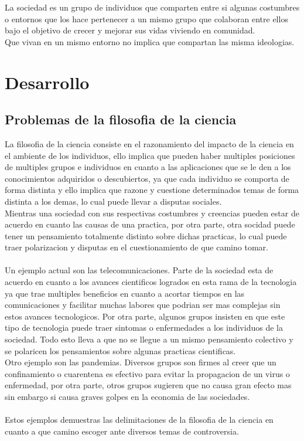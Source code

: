 La sociedad es un grupo de individuos que comparten entre si algunas costumbres o entornos que los hace pertenecer a un mismo grupo que colaboran entre ellos bajo el objetivo de crecer y mejorar sus vidas viviendo en comunidad.\\
Que vivan en un mismo entorno no implica que compartan las misma ideologias.

\section{Desarrollo}

\subsection{Problemas de la filosofia de la ciencia}

La filosofia de la ciencia consiste en el razonamiento del impacto de la ciencia en el ambiente de los individuos, ello implica que pueden haber multiples posiciones de multiples grupos e individuos en cuanto a las aplicaciones que se le den a los conocimientos adquiridos o descubiertos, ya que cada individuo se comporta de forma distinta y ello implica que razone y cuestione determinados temas de forma distinta a los demas, lo cual puede llevar a disputas sociales.
\\
Mientras una sociedad con sus respectivas costumbres y creencias pueden estar de acuerdo en cuanto las causas de una practica, por otra parte, otra socidad puede tener un pensamiento totalmente distinto sobre dichas practicas, lo cual puede traer polarizacion y disputas en el cuestionamiento de que camino tomar.
\\
\\
Un ejemplo actual son las telecomunicaciones. Parte de la sociedad esta de acuerdo en cuanto a los avances cientificos logrados en esta rama de la tecnologia ya que trae multiples beneficios en cuanto a acortar tiempos en las comunicaciones y facilitar muchas labores que podrian ser mas complejas sin estos avances tecnologicos. Por otra parte, algunos grupos insisten en que este tipo de tecnologia puede traer sintomas o enfermedades a los individuos de la sociedad. Todo esto lleva a que no se llegue a un mismo pensamiento colectivo y se polaricen los pensamientos sobre algunas practicas cientificas.
\\
Otro ejemplo son las pandemias. Diversos grupos son firmes al creer que un confinamiento o cuarentena es efectivo para evitar la propagacion de un virus o enfermedad, por otra parte, otros grupos sugieren que no causa gran efecto mas sin embargo si causa graves golpes en la economia de las sociedades.
\\
\\
Estos ejemplos demuestras las delimitaciones de la filosofia de la ciencia en cuanto a que camino escoger ante diversos temas de controversia.



